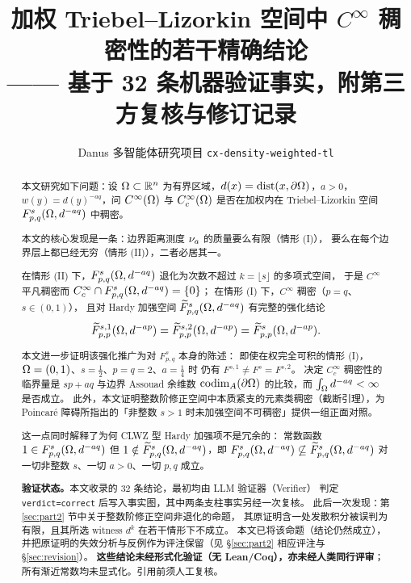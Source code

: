 

\title{\bfseries 加权 Triebel--Lizorkin 空间中 $C^\infty$ 稠密性的若干精确结论\\[4pt]
\large —— 基于 32 条机器验证事实，附第三方复核与修订记录}
\author{Danus 多智能体研究项目 \texttt{cx-density-weighted-tl}}
\date{}


\maketitle

\begin{abstract}
\noindent
本文研究如下问题：设 $\Omega\subset\mathbb{R}^n$ 为有界区域，$d(x)=\operatorname{dist}(x,\partial\Omega)$，$a>0$，
$w(y)=d(y)^{-aq}$，问 $C^\infty(\Omega)$ 与 $C_c^\infty(\Omega)$ 是否在加权内在
Triebel--Lizorkin 空间 $F^s_{p,q}(\Omega,d^{-aq})$ 中稠密。

本文的核心发现是一条：边界距离测度 $\nu_{a}$ 的质量要么有限（情形 (I)），
要么在每个边界层上都已经无穷（情形 (II)），二者必居其一。

在情形 (II) 下，$F^{s}_{p,q}(\Omega,d^{-aq})$ 退化为次数不超过 $k=\lfloor s\rfloor$ 的多项式空间，
于是 $C^\infty$ 平凡稠密而 $C_c^\infty\cap F^{s}_{p,q}(\Omega,d^{-aq})=\{0\}$；
在情形 (I) 下，$C^\infty$ 稠密（$p=q$、$s\in(0,1)$），
且对 Hardy 加强空间 $\widetilde F^{s}_{p,q}(\Omega,d^{-aq})$ 有完整的强化结论
\[
  \widetilde F^{s,1}_{p,p}(\Omega,d^{-ap})=\widetilde F^{s,2}_{p,p}(\Omega,d^{-ap})=\widetilde F^s_{p,p}(\Omega,d^{-ap}).
\]

本文进一步证明该强化推广为对 $F^s_{p,q}$ 本身的陈述：
即使在权完全可积的情形 (I)，$\Omega=(0,1)$、$s=\tfrac12$、$p=q=2$、$a=\tfrac14$ 时
仍有 $F^{s,1}\neq F^s=F^{s,2}$。
决定 $C_c^\infty$ 稠密性的临界量是 $sp+aq$ 与边界 Assouad 余维数
$\operatorname{codim}_{A}(\partial\Omega)$ 的比较，而 $\int_\Omega d^{-aq}<\infty$ 是否成立。
此外，本文证明整数阶修正空间中本质紧支的元素类稠密（截断引理），为 Poincar\'e 障碍所指出的「非整数 $s>1$ 时未加强空间不可稠密」提供一组正面对照。

这一点同时解释了为何 CLWZ 型 Hardy 加强项不是冗余的：
常数函数 $1\in F^{s}_{p,q}(\Omega,d^{-aq})$ 但 $1\notin\widetilde F^{s}_{p,q}(\Omega,d^{-aq})$，即 $F^{s}_{p,q}(\Omega,d^{-aq})\not\subseteq\widetilde F^{s}_{p,q}(\Omega,d^{-aq})$ 对一切非整数 $s$、一切 $a>0$、一切 $p,q$ 成立。

\medskip
\noindent\textbf{验证状态。}本文收录的 32 条结论，最初均由 LLM 验证器（\textsf{Verifier}）
判定 \texttt{verdict=correct} 后写入事实图，其中两条支柱事实另经一次复核。
此后一次发现：第 \ref{sec:part2} 节中关于整数阶修正空间非退化的命题，
其原证明含一处发散积分被误判为有限，且其所选 witness $d^k$ 在若干情形下不成立。
本文已将该命题（结论仍然成立），
并把原证明的失效分析与反例作为评注保留（见 \S\ref{sec:part2} 相应评注与 \S\ref{sec:revision}）。
\textbf{这些结论未经形式化验证（无 Lean/Coq），亦未经人类同行评审}；所有渐近常数均未显式化。引用前须人工复核。
\end{abstract}

